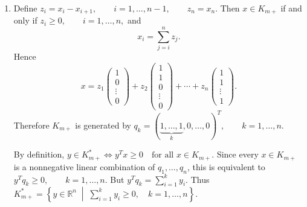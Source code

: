 \documentclass{ctexart}
\begin{document}
\begin{solution}
\begin{enumerate}
    \item
      Define
      \(
        z_i=x_i-x_{i+1},
        \qquad i=1,\ldots,n-1,
        \qquad
        z_n=x_n.
      \)
      Then \(x\in K_{m+}\) if and only if
      \(
        z_i\geq0,\qquad i=1,\ldots,n,
      \)
      and
      \[
        x_i=\sum_{j=i}^n z_j.
      \]
      Hence
      \[
        x
        =
        z_1
        \begin{pmatrix}
          1\\0\\ \vdots\\0
        \end{pmatrix}
        +
        z_2
        \begin{pmatrix}
          1\\1\\0\\ \vdots\\0
        \end{pmatrix}
        +\cdots+
        z_n
        \begin{pmatrix}
          1\\1\\ \vdots\\1
        \end{pmatrix}.
      \]
      Therefore \(K_{m+}\) is generated by
      \(
        q_k
        =
        (\underbrace{1,\ldots,1}_{k},0,\ldots,0)^T,
        \qquad k=1,\ldots,n.
      \)

      By definition,
      \(
        y\in K_{m+}^*
        \iff
        y^Tx\geq0
        \quad\text{for all }x\in K_{m+}.
      \)
      Since every \(x\in K_{m+}\) is a nonnegative linear combination
      of \(q_1,\ldots,q_n\), this is equivalent to
      \(
        y^Tq_k\geq0,
        \qquad k=1,\ldots,n.
      \)
      But
      \(
        y^Tq_k
        =
        \sum_{i=1}^k y_i.
      \)
      Thus
      \(
        K_{m+}^*
        =
        \left\{
          y\in\mathbb{R}^n
          \;\middle|\;
          \sum_{i=1}^k y_i\geq0,\quad
          k=1,\ldots,n
        \right\}.
      \)
  \end{enumerate}
\end{solution}
\end{document}
